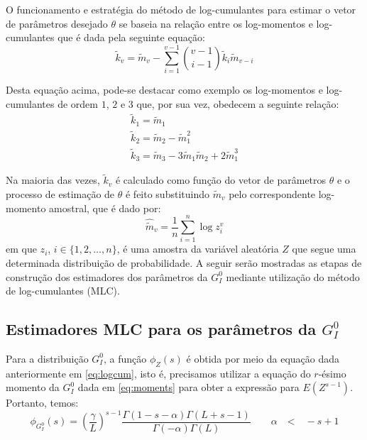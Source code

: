 O funcionamento e estratégia do método de log-cumulantes para estimar o vetor de parâmetros desejado $\theta$ se baseia na relação entre os log-momentos e log-cumulantes que é dada pela seguinte equação:
\begin{equation}
    \widetilde{k}_{v} = \widetilde{m}_{v} - \sum_{i=1}^{v-1}\binom{v-1}{i-1}\widetilde{k}_{i}\widetilde{m}_{v-i}
\end{equation}

Desta equação acima, pode-se destacar como exemplo os log-momentos e log-cumulantes de ordem $1$, $2$ e $3$ que, por sua vez, obedecem a seguinte relação:
\begin{equation}
    \begin{matrix}
        \widetilde{k}_{1} = \widetilde{m}_{1} \\ 
        \widetilde{k}_{2} = \widetilde{m}_{2} - \widetilde{m}_{1}^{2} \\
        \widetilde{k}_{3} = \widetilde{m}_{3} - 3\widetilde{m}_{1}\widetilde{m}_{2} + 2\widetilde{m}_{1}^{3} 
    \end{matrix}  
    \label{eq:logcum123}
\end{equation}

Na maioria das vezes, $\widetilde{k}_{v}$ é calculado como função do vetor de parâmetros $\theta$ e o processo de estimação de $\theta$ é feito substituindo $\widetilde{m}_{v}$ pelo correspondente log-momento amostral, que é dado por:
\begin{equation}
    \widehat{\widetilde{m}}_{v} = \frac{1}{n}\sum_{i=1}^{n}\log z_{i}^{v}
    \label{eq:log_momAmostrais}
\end{equation}
em que $z_i$, $i \in \{1, 2, \dots, n\}$, é uma amostra da variável aleatória $Z$ que segue uma determinada distribuição de probabilidade. A seguir serão mostradas as etapas de construção dos estimadores dos parâmetros da $G_I^0$ mediante utilização do método de log-cumulantes (MLC). 

\subsection{Estimadores MLC para os parâmetros da $G_I^0$}

Para a distribuição $G_I^0$, a função $\phi_{Z}(s)$ é obtida por meio da equação dada anteriormente em \eqref{eq:logcum}, isto é, precisamos utilizar a equação do $r$-ésimo momento da $G_I^0$ dada em \eqref{eq:moments} para obter a expressão para $E(Z^{s-1})$. Portanto, temos:
\begin{equation}
    \phi_{G_I^0}(s) = \left ( \frac{\gamma}{L} \right )^{s-1}\frac{\Gamma(1-s-\alpha)\Gamma(L+s-1)}{\Gamma(-\alpha)\Gamma(L)}  \qquad \alpha \quad \text{<} \quad -s+1
\end{equation}

